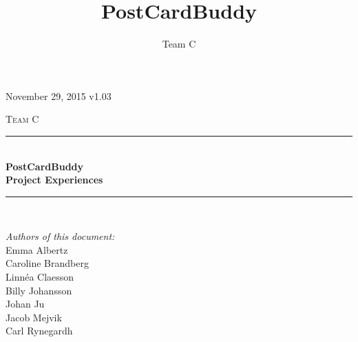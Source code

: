 \documentclass[10pt,a4paper]{article}
\title{PostCardBuddy}
\author{Team C}
\begin{document}
\begin{titlepage}
\newcommand{\HRule}{\rule{\linewidth}{0.5mm}}


\begin{flushright}
November 29, 2015 v1.03\\[3cm]
\end{flushright}


\centering
\textsc{\LARGE Team C}\\[0.5cm]

\HRule \\[0.4cm]
{ \huge \bfseries PostCardBuddy}\\[0.3cm]
{\Large \bfseries Project Experiences}\\[0.4cm] %
\HRule \\[1.5cm]

\vfill
\begin{flushleft}
\textit{Authors of this document:}\\
Emma Albertz\\
Caroline Brandberg\\
Linnéa Claesson\\
Billy Johansson\\
Johan Ju\\
Jacob Mejvik\\
Carl Rynegardh
\end{flushleft}

\end{titlepage}



%



\setcounter{tocdepth}{2}
\tableofcontents
\newpage
{}

\end{document}
